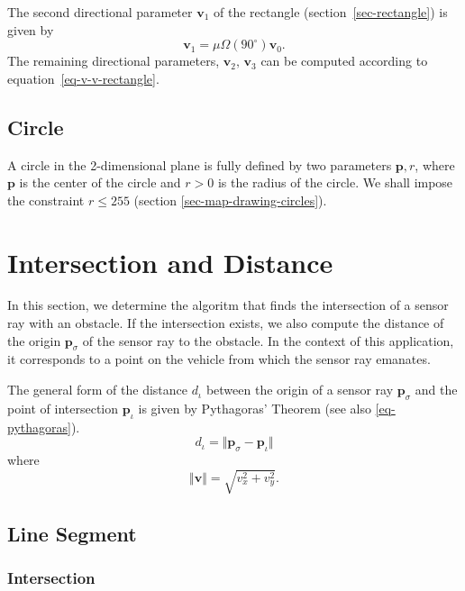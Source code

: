 \documentclass[11pt]{article}
\newcommand{\diota}{d_\iota}
\newcommand{\pb}{\mathbf{p}}
\newcommand{\pbiot}{\mathbf{p}_\iota}
\newcommand{\pbsig}{\mathbf{p}_\sigma}
\newcommand{\vb}{\mathbf{v}}
\begin{document}
The second directional parameter $\vb_1$ of the rectangle (section~\ref{sec-rectangle}) is given
by
\begin{equation}
    \vb_1 = \mu\Omega(90^\circ)\vb_0.\label{eq-vb1-rectangle}
\end{equation}
The remaining directional parameters, $\vb_2,\,\vb_3$ can be computed according
to equation~\eqref{eq-v-v-rectangle}.

\subsection{Circle}

A circle in the 2-dimensional plane is fully defined by two parameters
$\pb, r$, where $\pb$ is the center of the circle and $r>0$ is the
radius of the circle. We shall impose the constraint $r\leq 255$ (section
\ref{sec-map-drawing-circles}).


\section{Intersection and Distance}
\label{sec-intersection-distance}

In this section, we determine the algoritm that finds the intersection of a
sensor ray  with an obstacle. If the intersection
exists, we also compute the distance of the origin $\pbsig$ of the
sensor ray to the obstacle. In the context of this application, it
corresponds to a point on the vehicle from which the sensor ray emanates.

The general form of the distance $\diota$ between the origin of a sensor ray
$\pbsig$ and the point of intersection $\pbiot$ is given by
Pythagoras' Theorem (see also \eqref{eq-pythagoras}).
\begin{equation}
    \diota = \Vert\pbsig-\pbiot\Vert
\end{equation}
where
\begin{equation}
    \Vert\vb\Vert = \sqrt{v_{x}^2 + v_{y}^2}.\label{eq-pythagoras}
\end{equation}

\subsection{Line Segment}
\label{sec-intersection-line-segment}

\subsubsection*{Intersection}
\end{document}
